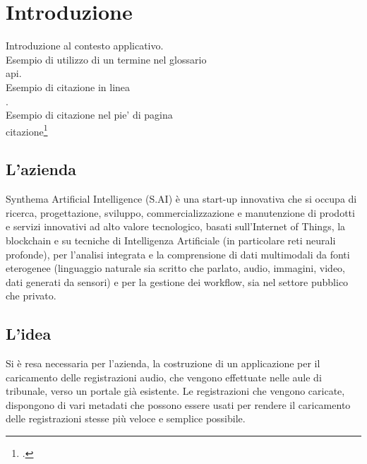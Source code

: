 
\chapter{Introduzione}
\label{cap:introduzione}

Introduzione al contesto applicativo.\\

\noindent Esempio di utilizzo di un termine nel glossario \\
\gls{api}. \\

\noindent Esempio di citazione in linea \\
\cite{site:agile-manifesto}. \\

\noindent Esempio di citazione nel pie' di pagina \\
citazione\footcite{womak:lean-thinking} \\

\section{L'azienda}
Synthema Artificial Intelligence (S.AI) è una start-up innovativa che si occupa di ricerca, progettazione, sviluppo, commercializzazione e manutenzione di prodotti e servizi innovativi ad alto valore tecnologico, basati sull'Internet of Things, la blockchain e su tecniche di Intelligenza Artificiale (in particolare reti neurali profonde), per l'analisi integrata e la comprensione di dati multimodali da fonti eterogenee (linguaggio naturale sia scritto che parlato, audio, immagini, video, dati generati da sensori) e per la gestione dei workflow, sia nel settore pubblico che privato. 

\section{L'idea}

Si è resa necessaria per l'azienda, la costruzione di un applicazione per il caricamento delle registrazioni audio, che vengono effettuate nelle aule di tribunale, verso un portale già esistente. Le registrazioni che vengono caricate, dispongono di vari metadati che possono essere usati per rendere il caricamento delle registrazioni stesse più veloce e semplice possibile. 

